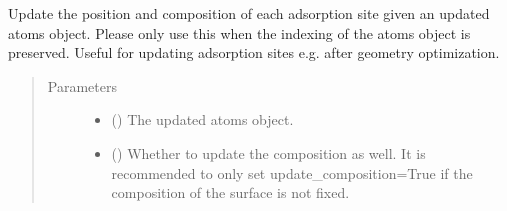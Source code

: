 \documentclass[letterpaper,10pt,english]{sphinxmanual}
\begin{document}
\begin{fulllineitems}
\begin{fulllineitems}
\label{\detokenize{modules:acat.adsorption_sites.SlabAdsorptionSites.update}}
Update the position and composition of each adsorption site
given an updated atoms object. Please only use this when the
indexing of the atoms object is preserved. Useful for updating
adsorption sites e.g. after geometry optimization.
\begin{quote}\begin{description}
\item[{Parameters}] \leavevmode\begin{itemize}
\item {} 
 () \textendash{} The updated atoms object.

\item {} 
 (\sphinxstyleliteralemphasis{\sphinxupquote{, }}) \textendash{} Whether to update the composition as well. It is recommended
to only set update\_composition=True if the composition of
the surface is not fixed.

\end{itemize}

\end{description}\end{quote}

\end{fulllineitems}


\end{fulllineitems}

\end{document}
